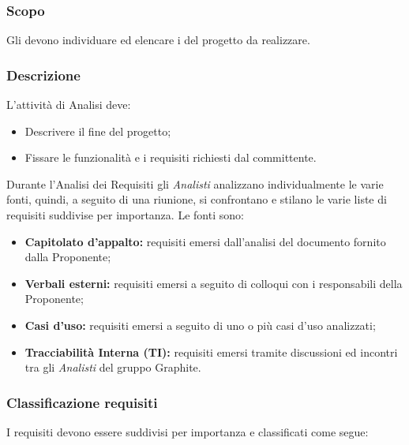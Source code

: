 \documentclass[../NomeDocumento.tex]{subfiles}
\begin{document}
	\subsubsection{Scopo} 
	
	Gli  devono individuare ed elencare i  del progetto da realizzare.
	
	\subsubsection{Descrizione}
	L'attività di Analisi deve:
	
	\begin{itemize}
		\item Descrivere il fine del progetto;
		\item Fissare le funzionalità e i requisiti richiesti dal committente.
	\end{itemize}

	\noindent Durante l’Analisi dei Requisiti gli \textit{Analisti} analizzano individualmente le varie fonti, quindi, a seguito di una riunione, si confrontano e stilano le varie liste di requisiti suddivise per importanza. Le fonti sono:
	 
	\begin{itemize}
		\item \textbf{Capitolato d’appalto:} requisiti emersi dall'analisi del documento fornito dalla Proponente;
		\item \textbf{Verbali esterni:} requisiti emersi a seguito di colloqui con i responsabili della Proponente;
		\item \textbf{Casi d'uso:} requisiti emersi a seguito di uno o più casi d’uso analizzati;
		\item \textbf{Tracciabilità Interna (TI):} requisiti emersi tramite discussioni ed incontri tra gli \textit{Analisti} del gruppo Graphite.
	\end{itemize}

	\subsubsection{Classificazione requisiti} 
	
	I requisiti devono essere suddivisi per importanza e classificati come segue:
	
\end{document}
